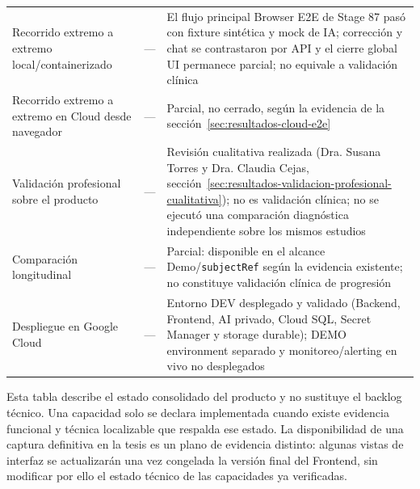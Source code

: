 {\begin{longtable}{>{\raggedright\arraybackslash}p{} >{\raggedright\arraybackslash}p{} >{\raggedright\arraybackslash}p{}}
Recorrido extremo a extremo local/containerizado & --- & El flujo principal Browser E2E de Stage 87 pasó con fixture sintética y mock de IA; corrección y chat se contrastaron por API y el cierre global UI permanece parcial; no equivale a validación clínica \\
Recorrido extremo a extremo en Cloud desde navegador & --- & Parcial, no cerrado, según la evidencia de la sección~\ref{sec:resultados-cloud-e2e} \\
Validación profesional sobre el producto & — & Revisión cualitativa realizada (Dra. Susana Torres y Dra. Claudia Cejas, sección~\ref{sec:resultados-validacion-profesional-cualitativa}); no es validación clínica; no se ejecutó una comparación diagnóstica independiente sobre los mismos estudios \\
Comparación longitudinal & — & Parcial: disponible en el alcance Demo/\texttt{subjectRef} según la evidencia existente; no constituye validación clínica de progresión \\
Despliegue en Google Cloud & — & Entorno DEV desplegado y validado (Backend, Frontend, AI privado, Cloud SQL, Secret Manager y storage durable); DEMO environment separado y monitoreo/alerting en vivo no desplegados \\\hline
\end{longtable}
}

Esta tabla describe el estado consolidado del producto y no sustituye el backlog técnico. Una capacidad solo se declara implementada cuando existe evidencia funcional y técnica localizable que respalda ese estado. La disponibilidad de una captura definitiva en la tesis es un plano de evidencia distinto: algunas vistas de interfaz se actualizarán una vez congelada la versión final del Frontend, sin modificar por ello el estado técnico de las capacidades ya verificadas.
